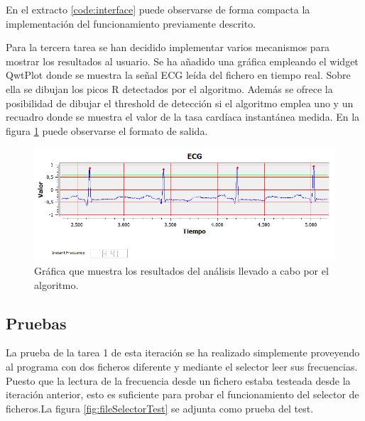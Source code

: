         En el extracto \ref{code:interface} puede observarse de forma compacta la implementación del funcionamiento previamente descrito. 
        

        Para la tercera tarea se han decidido implementar varios mecanismos para mostrar los resultados al usuario. Se ha añadido una gráfica empleando el widget QwtPlot donde se muestra la señal ECG leída del fichero en tiempo real. Sobre ella se dibujan los picos R detectados por el algoritmo. Además se ofrece la posibilidad de dibujar el threshold de detección si el algoritmo emplea uno y un recuadro donde se muestra el valor de la tasa cardíaca instantánea medida. En la figura \ref{fig:resultsBasic} puede observarse el formato de salida.

        \begin{figure}[H]
                \centering
                        \includegraphics[width =\linewidth]{figuras/ResultsBasic.png}
                \caption{Gráfica que muestra los resultados del análisis llevado a cabo por el algoritmo.}
                \label{fig:resultsBasic}
        \end{figure}
        
    \subsection{Pruebas}
        
        La prueba de la tarea 1 de esta iteración se ha realizado simplemente proveyendo al programa con dos ficheros diferente y mediante el selector leer sus frecuencias. Puesto que la lectura de la frecuencia desde un fichero estaba testeada desde la iteración anterior, esto es suficiente para probar el funcionamiento del selector de ficheros.La figura \ref{fig:fileSelectorTest} se adjunta como prueba del test.

